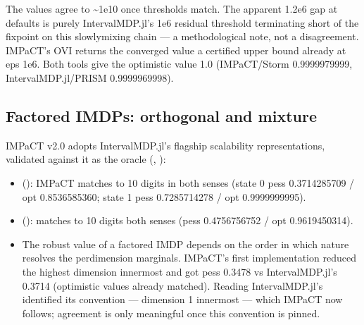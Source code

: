\documentclass[a4paper,10pt,english]{sphinxmanual}
\begin{document}
\sphinxAtStartPar
The values agree to \textasciitilde{}1e\sphinxhyphen{}10 once thresholds match. The apparent 1.2e\sphinxhyphen{}6 gap at defaults is
purely IntervalMDP.jl’s 1e\sphinxhyphen{}6 residual threshold terminating short of the fixpoint on
this slowly\sphinxhyphen{}mixing chain — a methodological note, not a disagreement. IMPaCT’s OVI
returns the converged value  a certified upper bound already at eps 1e\sphinxhyphen{}6. Both
tools give the optimistic value 1.0 (IMPaCT/Storm 0.9999979999, IntervalMDP.jl/PRISM
0.9999969998).


\subsection{Factored IMDPs: orthogonal and mixture}
\label{\detokenize{comparison/impact-vs-intervalmdp:factored-imdps-orthogonal-and-mixture}}
\sphinxAtStartPar
IMPaCT v2.0 adopts IntervalMDP.jl’s flagship scalability representations, validated
against it as the oracle (, ):
\begin{itemize}
\item {} 
\sphinxAtStartPar
{} (): IMPaCT matches
 to 10 digits in both senses (state 0 pess
0.3714285709 / opt 0.8536585360; state 1 pess 0.7285714278 / opt 0.9999999995).

\item {} 
\sphinxAtStartPar
{} (): matches
 to 10 digits both senses (pess 0.4756756752 /
opt 0.9619450314).

\item {} 
\sphinxAtStartPar
{} The robust value of a factored IMDP
depends on the order in which nature resolves the per\sphinxhyphen{}dimension marginals. IMPaCT’s
first implementation reduced the highest dimension innermost and got pess 0.3478 vs
IntervalMDP.jl’s 0.3714 (optimistic values already matched). Reading
IntervalMDP.jl’s  identified its convention — dimension 1
innermost — which IMPaCT now follows; agreement is only meaningful once this
convention is pinned.

\end{itemize}
\end{document}
